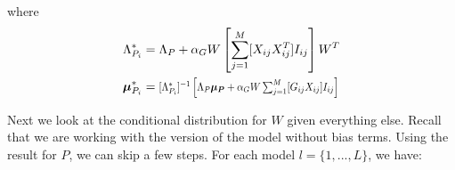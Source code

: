 \documentclass[10pt]{proc}
\begin{document}
%
where
\pagebreak
%
\begin{align}
    \Lambda_{P_i}^* &= \begin{aligned}[t]
        \Lambda_P + \alpha_G W \left[\sum_{j=1}^M
            [X_{ij} X_{ij}^T] I_{ij}
        \right] W^T
    \end{aligned}\\
%
    \bm{\mu}_{P_i}^* &= \begin{aligned}[t]
        \vstretch{0.9}{\hstretch{0.8}{
            [\Lambda_{P_i}^*]^{-1} \left[
                \Lambda_P\bm{\mu_P} +
                \alpha_G W \sum_{j=1}^M [G_{ij} X_{ij}] I_{ij}
            \right]}}
    \end{aligned}
\end{align}

Next we look at the conditional distribution for $W$ given everything else.
Recall that we are working with the version of the model without bias terms.
Using the result for $P$, we can skip a few steps. For each model $l = \{1, ...,
L\}$, we have:
%
\end{document}
